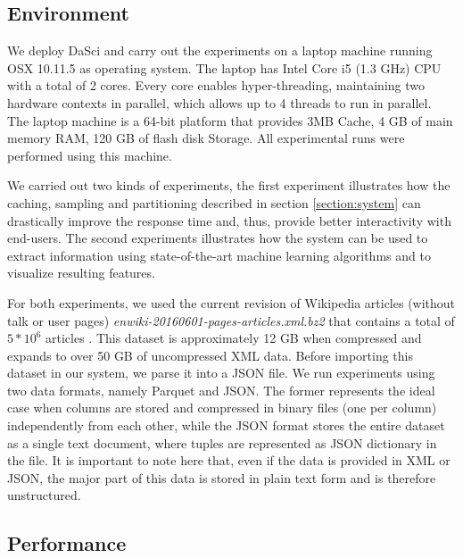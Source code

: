 \documentclass[10pt, a4paper, twocolumn]{article} %
\begin{document}
\subsection{Environment}

We deploy DaSci and carry out the experiments on a laptop machine running OSX 10.11.5 as operating system. The laptop has Intel Core i5 (1.3 GHz) CPU with a total of 2 cores. Every core enables hyper-threading, maintaining two hardware contexts in parallel, which allows up to 4 threads to run in parallel.
The laptop machine is a 64-bit platform that provides 3MB Cache, 4 GB of main memory RAM, 120 GB of flash disk Storage. All experimental runs were performed using this machine.

We carried out two kinds of experiments, the first experiment illustrates how the caching, sampling and partitioning described in section \ref{section:system} can drastically improve the response time and, thus, provide better interactivity with end-users. The second experiments illustrates how the system can be used to extract information using state-of-the-art machine learning algorithms and to visualize resulting features.

For both experiments, we used the current revision of Wikipedia articles (without talk or user pages) \textit{enwiki-20160601-pages-articles.xml.bz2} that contains a total of $5*10^6$ articles \cite{wikipedia}. This dataset is approximately 12 GB when compressed and expands to over 50 GB of uncompressed XML data. Before importing this dataset in our system, we parse it into a JSON file.
We run experiments using two data formats, namely Parquet and JSON. 
The former represents the ideal case when columns are stored and compressed in binary files (one per column) independently from each other, while the JSON format stores the entire dataset as a single text document, where tuples are represented as JSON dictionary in the file.
It is important to note here that, even if the data is provided in XML or JSON, the major part of this data is stored in plain text form and is therefore unstructured.


\subsection{Performance}
\end{document}
